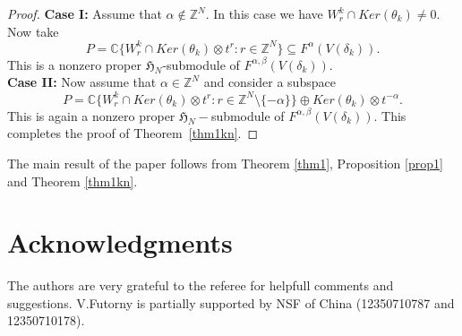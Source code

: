 \documentclass[a4paper,11pt]{amsart}
\numberwithin{equation}{section}
\theoremstyle{plain}
\newcommand{\Z}{\mathbb{Z}}
\newcommand{\C}{\mathbb{C}}
\newcommand{\Ha}{\mathfrak{H}_{N}}
\begin{document}
\begin{proof}
      
     
    {\bf Case I:} Assume that $\alpha \notin \Z^N$.  In this case we  have $W_r^k\cap Ker(\theta_k)\neq 0$. Now take $$P=\C \{W_r^k\cap Ker(\theta_k)\otimes t^r:r\in \Z^N\}\subseteq F^\alpha(V(\delta_k)).$$ This is a nonzero proper $\Ha$-submodule of $F^{\alpha,\beta}(V(\delta_k))$.\\

    
    {\bf Case II:} Now assume that $\alpha\in \Z^N$ and consider a subspace $$P=\C \{W_r^k\cap Ker(\theta_k)\otimes t^r:r\in \Z^N\setminus\{-\alpha\}\}\oplus Ker(\theta_k)\otimes t^{-\alpha}.$$ This is again a nonzero  proper $\Ha-$submodule of $F^{\alpha,\beta}(V(\delta_k))$. This completes the proof of Theorem~\ref{thm1kn}.
\end{proof}

The main result of the paper follows from Theorem \ref{thm1}, Proposition \ref{prop1} and Theorem \ref{thm1kn}.

\section{Acknowledgments}
\noindent The authors are very grateful to the referee for helpfull comments and suggestions. V.Futorny is partially supported by NSF of China (12350710787 and 12350710178). 
\end{document}
